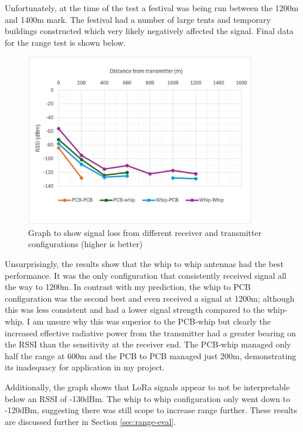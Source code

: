 Unfortunately, at the time of the test a festival was being run between the
1200m and 1400m mark. The festival had a number of large tents and temporary
buildings constructed which very likely negatively affected the signal. Final
data for the range test is shown below.

\begin{figure}[H]
    \centering
    \includegraphics[width=0.9\textwidth]{contents/part-2/fig2/distance-graph.jpg}
    \caption{Graph to show signal loss from different receiver and transmitter configurations (higher is better)}
    \label{fig:range-test-graph}
\end{figure}

Unsurprisingly, the results show that the whip to whip antennas had the best
performance. It was the only configuration that consistently received signal all
the way to 1200m. In contrast with my prediction, the whip to PCB configuration
was the second best and even received a signal at 1200m; although this was less
consistent and had a lower signal strength compared to the whip-whip. I am
unsure why this was superior to the PCB-whip but clearly the increased effective
radiative power from the transmitter had a greater bearing on the RSSI than the
sensitivity at the receiver end. The PCB-whip managed only half the range at
600m and the PCB to PCB managed just 200m, demonstrating its inadequacy for
application in my project.

Additionally, the graph shows that LoRa signals appear to not be interpretable
below an RSSI of -130dBm. The whip to whip configuration only went down to
-120dBm, suggesting there was still scope to increase range further. These
results are discussed further in Section \ref{sec:range-eval}.

